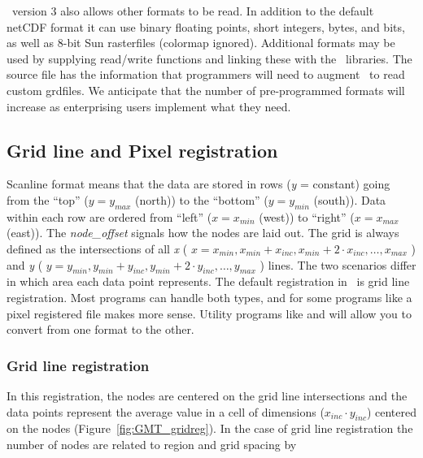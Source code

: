 
\GMT\ version 3 also allows other formats to be read.  In addition to
the default netCDF format it can use binary floating points, short
integers, bytes, and bits, as well as 8-bit Sun rasterfiles (colormap
ignored).   Additional formats may be used by supplying read/write
functions and linking these with the \GMT\ libraries.
The source file  has the information that
programmers will need to augment \GMT\ to read custom grdfiles.  We
anticipate that the number of pre-programmed formats will increase as
enterprising users implement what they need.

\subsection{Grid line and Pixel registration} 

Scanline format means that the data are stored in rows ({\it y} = constant)
going from the ``top'' ($y = y_{max}$ (north)) to the ``bottom''
($y = y_{min}$ (south)).  Data within each row are ordered from
``left'' ($x = x_{min}$ (west)) to ``right'' ($x = x_{max}$
(east)).  The {\it node\_offset} signals how the nodes are laid out.
The grid is always defined as the intersections of all {\it x}
( \( x = x_{min}, x_{min} + x_{inc}, x_{min} + 2 \cdot x_{inc}, \ldots, x_{max} \) )
and {\it y} ( \( y = y_{min}, y_{min} + y_{inc}, y_{min} + 2 \cdot y_{inc}, \ldots, y_{max} \) )
lines.  The two scenarios differ in which area each data point
represents.
The default registration in \GMT\ is grid line registration.  Most
programs can handle both types, and for some programs like 
a pixel registered file makes more sense.  Utility programs like
 and  will allow you to convert
from one format to the other.

\subsubsection{Grid line registration}

In this registration, the nodes are centered on the grid line
intersections and the data points represent the average value
in a cell of dimensions ($x_{inc} \cdot y_{inc}$) centered on the
nodes (Figure~\ref{fig:GMT_gridreg}).
In the case of grid line registration the number of nodes are
related to region and grid spacing by \\

